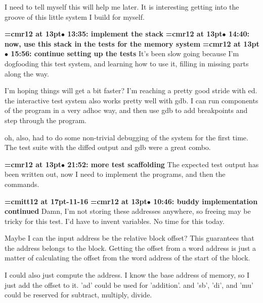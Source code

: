 I need to tell myself this will help me later. It is interesting getting into the groove of this little system I build for myself.
\par

{\smallskip\noindent\bf\font\titlefont=cmr12 at 13pt\titlefont $\bullet$ 13:35: implement the stack}\smallskip
{\smallskip\noindent\bf\font\titlefont=cmr12 at 13pt\titlefont $\bullet$ 14:40: now, use this stack in the tests for the memory system}\smallskip
{\smallskip\noindent\bf\font\titlefont=cmr12 at 13pt\titlefont $\bullet$ 15:56: continue setting up the tests}\smallskip
It's been slow going because I'm dogfooding this test system, and learning how to use it, filling in missing parts along the way.
\par

I'm hoping things will get a bit faster? I'm reaching a pretty good stride with ed. the interactive test system also works pretty well with gdb. I can run components of the program in a very adhoc way, and then use gdb to add breakpoints and step through the program.
\par

oh, also, had to do some non-trivial debugging of the system for the first time. The test suite with the diffed output and gdb were a great combo.
\par

{\smallskip\noindent\bf\font\titlefont=cmr12 at 13pt\titlefont $\bullet$ 21:52: more test scaffolding}\smallskip
The expected test output has been written out, now I need to implement the programs, and then the commands.
\par

{\medskip\noindent\bf\font\titlefont=cmitt12 at 17pt-11-16}\medskip
{\smallskip\noindent\bf\font\titlefont=cmr12 at 13pt\titlefont $\bullet$ 10:46: buddy implementation continued}\smallskip
Damn, I'm not storing these addresses anywhere, so freeing may be tricky for this test. I'd have to invent variables. No time for this today.
\par

Maybe I can the input address be the relative block offset? This guarantees that the address belongs to the block. Getting the offset from a word address is just a matter of calculating the offset from the word address of the start of the block.
\par

I could also just compute the address. I know the base address of memory, so I just add the offset to it. 'ad' could be used for 'addition'. and 'sb', 'di', and 'mu' could be reserved for subtract, multiply, divide.
\par

